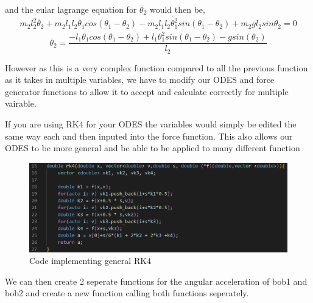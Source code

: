 \documentclass[12pt, a2paper]{article}
\begin{document}
and the eular lagrange equation for \(\ddot{\theta_{2}}\) would then be,
\[m_{2}l_{2}^2\ddot{\theta_{2}}+m_{2}l_{1}l_{2}\ddot{\theta_{1}}cos(\theta_{1}-\theta_{2})-m_{2}l_{1}l_{2}\dot{\theta_{1}^2}sin(\theta_{1}-\theta_{2})+m_{2}gl_{2}sin\theta_{2} = 0\]
\[\ddot{\theta_{2}} = \frac{-l_{1}\ddot{\theta_{1}}cos(\theta_{1}-\theta_{2})+l_{1}\dot{\theta_{1}^2}sin(\theta_{1}-\theta_{2})-gsin(\theta_{2})}{l_{2}}\]

However as this is a very complex function compared to all the previous function as it takes in multiple variables, we have to modify our ODES and force generator functions to allow it to accept and calculate correctly for multiple vairable. 

If you are using RK4 for your ODES the variables would simply be edited the same way each and then inputed into the force function. This also allows our ODES to be more general and be able to be applied to many different function
\begin{figure}[h]
\center
\includegraphics[width=1\textwidth]{RK4 general function}
\caption{Code implementing general RK4}
\label{fig 6}
\end{figure}
\pagebreak

We can then create 2 seperate functions for the angular acceleration of bob1 and bob2 and create a new function calling both functions seperately.
\end{document}
